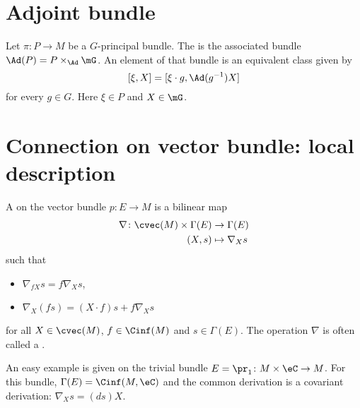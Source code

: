 

\section{Adjoint bundle}

Let $\pi\colon P\to M$ be a $G$-principal bundle. The  is the associated bundle $\Ad(P)=P\times_{\Ad}\mG$. An element of that bundle is an equivalent class given by
\[
  [\xi,X]=[\xi\cdot g,\Ad(g^{-1})X]
\]
for every $g\in G$. Here $\xi\in P$ and $X\in\mG$.

\section{Connection on vector bundle: local description}\label{sec:conn_vect}

\begin{definition}      \label{DEFooIESVooGNQHzl}
    A  on the vector bundle $p\colon E\to M$ is a bilinear map
    \begin{equation}
        \begin{aligned}
                \nabla \colon \cvec(M)\times\Gamma(E) &\to \Gamma(E)\\
                (X,s)&\mapsto \nabla_Xs
        \end{aligned}
    \end{equation}
     such that
     \begin{itemize}
     \item $\nabla_{fX}s=f\nabla_Xs$,
     \item $\nabla_X(fs)=(X\cdot f)s+f\nabla_Xs$
     \end{itemize}
    for all $X\in\cvec(M)$, $f\in\Cinf(M)$ and $s\in\Gamma(E)$. The operation $\nabla$ is often called a .
\end{definition}

An easy example is given on the trivial bundle $E=\pr_1\colon M\times\eC\to M$. For this bundle, $\Gamma(E)=\Cinf(M,\eC)$ and the common derivation is a covariant derivation: $\nabla_Xs=(ds)X$.

